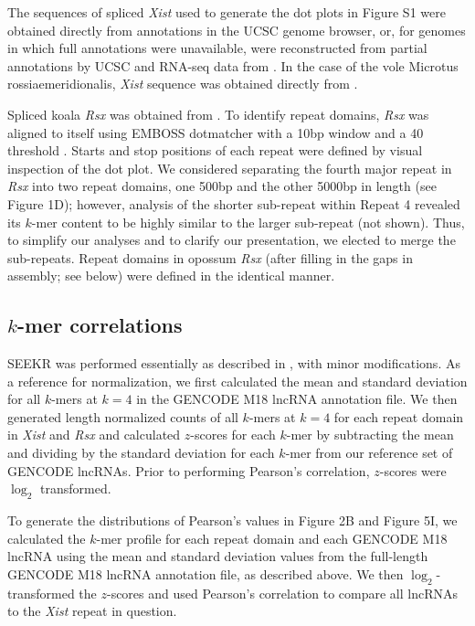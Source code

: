 The sequences of spliced \emph{Xist} used to generate the dot plots in Figure S1 were obtained directly from annotations in the UCSC genome browser, or, for genomes in which full annotations were unavailable, were reconstructed from partial annotations by UCSC and RNA-seq data from \cite{Hezroni2015PrinciplesSpecies}. In the case of the vole Microtus rossiaemeridionalis, \emph{Xist} sequence was obtained directly from \cite{Nesterova2001CharacterizationSequence}.

Spliced koala \emph{Rsx} was obtained from \cite{Johnson2018AdaptationGenome}. To identify repeat domains, \emph{Rsx} was aligned to itself using EMBOSS dotmatcher with a 10bp window and a 40 threshold \cite{Rice2000EMBOSS:Suite}. Starts and stop positions of each repeat were defined by visual inspection of the dot plot. We considered separating the fourth major repeat in \emph{Rsx} into two repeat domains, one 500bp and the other 5000bp in length (see Figure 1D); however, analysis of the shorter sub-repeat within Repeat 4 revealed its $k$-mer content to be highly similar to the larger sub-repeat (not shown). Thus, to simplify our analyses and to clarify our presentation, we elected to merge the sub-repeats. Repeat domains in opossum \emph{Rsx} (after filling in the gaps in assembly; see below) were defined in the identical manner.

\subsection{$k$-mer correlations}
SEEKR was performed essentially as described in \cite{Kirk2018FunctionalContent}, with minor modifications. As a reference for normalization, we first calculated the mean and standard deviation for all $k$-mers at $k = 4$ in the GENCODE M18 lncRNA annotation file. We then generated length normalized counts of all $k$-mers at $k = 4$ for each repeat domain in \emph{Xist} and \emph{Rsx} and calculated $z$-scores for each $k$-mer by subtracting the mean and dividing by the standard deviation for each $k$-mer from our reference set of GENCODE lncRNAs. Prior to performing Pearson’s correlation, $z$-scores were $\log_2$ transformed. 

To generate the distributions of Pearson’s values in Figure 2B and Figure 5I, we calculated the $k$-mer profile for each repeat domain and each GENCODE M18 lncRNA using the mean and standard deviation values from the full-length GENCODE M18 lncRNA annotation file, as described above. We then $\log_2$-transformed the $z$-scores and used Pearson’s correlation to compare all lncRNAs to the \emph{Xist} repeat in question. 
